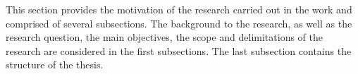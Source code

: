 %
%
This section provides the motivation of the research carried out in the work and comprised of 
several subsections. 
%
The background to the research, as well as the research question, the main objectives, the scope 
and delimitations of the research are considered in the first subsections. 
%
The last subsection contains the structure of the thesis. 